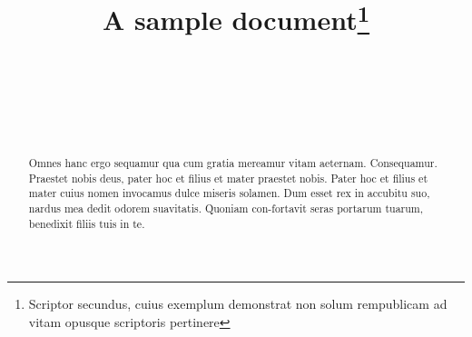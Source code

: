 \documentclass{arkiv}
\begin{document}
\begin{frontmatter}

\title{A sample document\thanks{Scriptor secundus,
cuius exemplum demonstrat non solum rempublicam ad vitam opusque scriptoris pertinere}}

\begin{aug}
\author[1]{~}%
\author[2]{~}%
\author[2]{~}%
%
\address[1]{\\
\\
\\
\\
}
%
\address[2]{\\
\\
\\
\\
}
%
\end{aug}


\begin{abstract}
Omnes hanc ergo sequamur qua cum gratia mereamur vitam aeternam.
Consequamur. Praestet nobis deus, pater hoc et filius et mater
praestet nobis.  Pater hoc et filius et mater cuius nomen invocamus
dulce miseris solamen. Dum esset rex in accubitu suo, nardus mea
dedit odorem suavitatis. Quoniam con-fortavit seras portarum tuarum,
benedixit filiis tuis in te.
\end{abstract}

\begin{keyword}
\kwd{\LaTeX}
\end{keyword}
%
%
\begin{keyword}[class=MSC]
\end{keyword}
%

\end{frontmatter}
\end{document}
